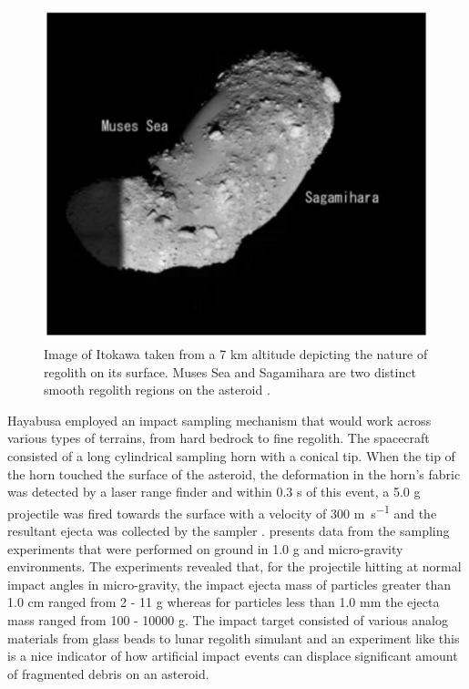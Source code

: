 \begin{figure}[htb]
\centering
\captionsetup{justification=centering}
\includegraphics[width=\linewidth, height=0.4\textheight, keepaspectratio=true]{itokawa_regolith.pdf}
\caption{Image of Itokawa taken from a 7 \si{\kilo\metre} altitude depicting the nature of regolith on its surface. Muses Sea and Sagamihara are two distinct smooth regolith regions on the asteroid \parencite{fujiwara2006ItokawaHayabusa}.}
\label{fig:itokawa_regolith}
\end{figure}
\FloatBarrier
Hayabusa employed an impact sampling mechanism that would work across various types of terrains, from hard bedrock to fine regolith. The spacecraft consisted of a long cylindrical sampling horn with a conical tip. When the tip of the horn touched the surface of the asteroid, the deformation in the horn's fabric was detected by a laser range finder and within 0.3 \si{\second} of this event, a 5.0 \si{\gram} projectile was fired towards the surface with a velocity of 300 \si{\metre\per\second} and the resultant ejecta was collected by the sampler \parencite{yano2004sampling}. \cite{yanoHayabusaTouchdown} presents data from the sampling experiments that were performed on ground in 1.0 \si{\gram} and micro-gravity environments. The experiments revealed that, for the projectile hitting at normal impact angles in micro-gravity, the impact ejecta mass of particles greater than 1.0 \si{\centi\metre} ranged from 2 - 11 \si{\gram} whereas for particles less than 1.0 \si{\milli\metre} the ejecta mass ranged from 100 - 10000 \si{\gram}. The impact target consisted of various analog materials from glass beads to lunar regolith simulant and an experiment like this is a nice indicator of how artificial impact events can displace significant amount of fragmented debris on an asteroid.

